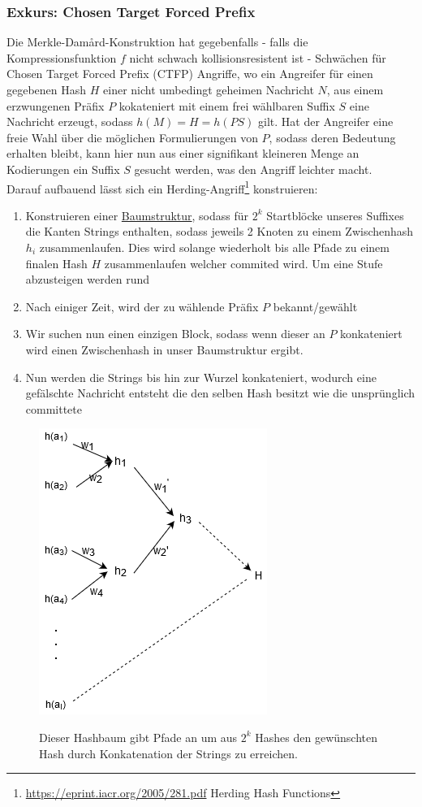 \documentclass[a4paper,12pt,leqno]{article}
\begin{document}
\subsubsection{Exkurs: Chosen Target Forced Prefix}
Die Merkle-Dam\r{a}rd-Konstruktion hat gegebenfalls - falls die Kompressionsfunktion $f$ nicht schwach kollisionsresistent ist - Schwächen für Chosen Target Forced Prefix (CTFP) Angriffe, wo ein Angreifer für einen gegebenen Hash $H$ einer nicht umbedingt geheimen Nachricht $N$, aus einem erzwungenen Präfix $P$ kokateniert mit einem frei wählbaren Suffix $S$ eine Nachricht erzeugt, sodass $h(M)=H=h(PS)$ gilt. Hat der Angreifer eine freie Wahl über die möglichen Formulierungen von $P$, sodass deren Bedeutung erhalten bleibt, kann hier nun aus einer signifikant kleineren Menge an Kodierungen ein Suffix $S$ gesucht werden, was den Angriff leichter macht.\\
Darauf aufbauend lässt sich ein Herding-Angriff\footnote{\url{https://eprint.iacr.org/2005/281.pdf} Herding Hash Functions} konstruieren:
\begin{enumerate}
\item Konstruieren einer \hyperref[pic:herdingattack]{Baumstruktur}, sodass für $2^k$ Startblöcke unseres Suffixes die Kanten Strings enthalten, sodass jeweils 2 Knoten zu einem Zwischenhash $h_i$ zusammenlaufen. Dies wird solange wiederholt bis alle Pfade zu einem finalen Hash $H$ zusammenlaufen welcher commited wird. Um eine Stufe abzusteigen werden rund
\item Nach einiger Zeit, wird der zu wählende Präfix $P$ bekannt/gewählt
\item Wir suchen nun einen einzigen Block, sodass wenn dieser an $P$ konkateniert wird einen Zwischenhash in unser Baumstruktur ergibt.
\item Nun werden die Strings bis hin zur Wurzel konkateniert, wodurch eine gefälschte Nachricht entsteht die den selben Hash besitzt wie die unsprünglich committete 
\end{enumerate}

\begin{figure}
\centering
\includegraphics[scale=0.6]{Grafiken/HerdingAttack.png}
\label{pic:herdingattack}
\caption{Dieser Hashbaum gibt Pfade an um aus $2^k$ Hashes den gewünschten Hash durch Konkatenation der Strings zu erreichen.}
\end{figure}
\end{document}
